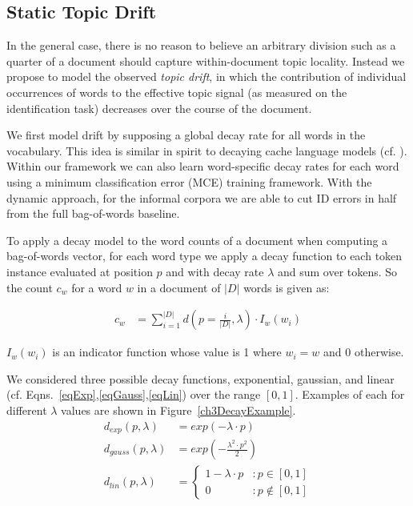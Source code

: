 \subsection{Static Topic Drift}
In the general case, there is no reason to believe an arbitrary division such as a quarter of a document should capture within-document topic locality. Instead we propose to model the observed \textit{topic drift}, in which the contribution of individual occurrences of words to the effective topic signal (as measured on the identification task) decreases over the course of the document.

We first model drift by supposing a global decay rate for all words in the vocabulary.  This idea is similar in spirit to decaying cache language models (cf. \cite{clarkson1997}).   Within our framework we can also learn word-specific decay rates for each word using a minimum classification error (MCE) training framework.  With the dynamic approach, for the informal corpora we are able to cut ID errors in half from the full bag-of-words baseline.

To apply a decay model to the word counts of a document when computing a bag-of-words vector, for each word type we apply a decay function to each token instance evaluated at position $p$ and with decay rate $\lambda$ and sum over tokens.  So the count $c_w$ for a word $w$ in a document of $|D|$ words is given as:

\begin{align}
c_{w} &= \sum_{i=1}^{|D|}{d\left(p=\frac{i}{|D|},\lambda\right) \cdot I_{w}(w_i)}
\label{eqStatic}
\end{align}

$I_w(w_i)$ is an indicator function whose value is 1 where $w_i=w$ and 0 otherwise.

We considered three possible decay functions, exponential, gaussian, and linear (cf. Eqns.~\ref{eqExp},\ref{eqGauss},\ref{eqLin}) over the range $[0,1]$.   Examples of each for different $\lambda$ values are shown in Figure~\ref{ch3DecayExample}.
\begin{align}
  d_{exp}(p, \lambda) &= exp \left ({ -\lambda \cdot p }\right ) \label{eqExp} \\
  d_{gauss}(p, \lambda) &= exp \left ({ -\frac{\lambda^2 \cdot p^2}{2} }\right) \label{eqGauss} \\
  d_{lin}(p, \lambda) &=  \left\{
     \begin{array}{lr}
       1 - \lambda \cdot p & : p \in [0,1]\\
       0 & : p \notin [0,1]
     \end{array}
   \right. \label{eqLin}
\end{align}

